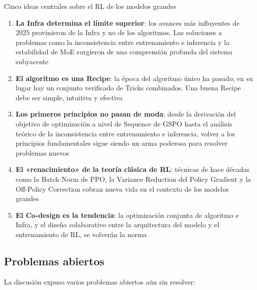 \documentclass[a4paper]{article}
\begin{document}
\begin{importantbox}{Cinco ideas centrales sobre el RL de los modelos grandes}
\begin{enumerate}
    \item \textbf{La Infra determina el límite superior}: los avances más influyentes de 2025 provinieron de la Infra y no de los algoritmos. Las soluciones a problemas como la inconsistencia entre entrenamiento e inferencia y la estabilidad de MoE surgieron de una comprensión profunda del sistema subyacente
    \item \textbf{El algoritmo es una Recipe}: la época del algoritmo único ha pasado; en su lugar hay un conjunto verificado de Tricks combinados. Una buena Recipe debe ser simple, intuitiva y efectiva
    \item \textbf{Los primeros principios no pasan de moda}: desde la derivación del objetivo de optimización a nivel de Sequence de GSPO hasta el análisis teórico de la inconsistencia entre entrenamiento e inferencia, volver a los principios fundamentales sigue siendo un arma poderosa para resolver problemas nuevos
    \item \textbf{El «renacimiento» de la teoría clásica de RL}: técnicas de hace décadas como la Batch Norm de PPO, la Variance Reduction del Policy Gradient y la Off-Policy Correction cobran nueva vida en el contexto de los modelos grandes
    \item \textbf{El Co-design es la tendencia}: la optimización conjunta de algoritmo e Infra, y el diseño colaborativo entre la arquitectura del modelo y el entrenamiento de RL, se volverán la norma
\end{enumerate}
\end{importantbox}

\subsection{Problemas abiertos}

La discusión expuso varios problemas abiertos aún sin resolver:
\end{document}
